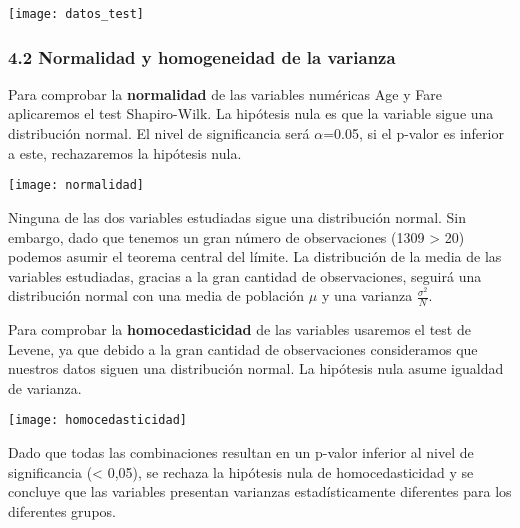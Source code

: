 \documentclass[12pt]{article}
\begin{document}
\label{imagen}
  	\begin{center}
  	\texttt{[image: datos\_test]}
\end{center}

\hypertarget{normalidad}{%
\subsubsection{4.2  Normalidad y homogeneidad de la varianza}\label{normalidad}}
Para comprobar la \textbf{normalidad} de las variables numéricas Age y Fare aplicaremos el test Shapiro-Wilk. La hipótesis nula es que la variable sigue una distribución normal. El nivel de significancia será 
$\alpha$=0.05, si el p-valor es inferior a este, rechazaremos la hipótesis nula. 

\label{imagen}
  	\begin{center}
  	\texttt{[image: normalidad]}
\end{center}

Ninguna de las dos variables estudiadas sigue una distribución normal. Sin embargo, dado que tenemos un gran número de observaciones (1309 > 20) podemos asumir el teorema central del límite. La distribución de la media de las variables estudiadas, gracias a la gran cantidad de observaciones, seguirá una distribución normal con una media de población $\mu$ y una varianza $\frac{\sigma^2}{N}$.

Para comprobar la \textbf{homocedasticidad} de las variables usaremos el test de Levene, ya que debido a la gran cantidad de observaciones consideramos que nuestros datos siguen una distribución normal. La hipótesis nula asume igualdad de varianza.

\label{imagen}
  	\begin{center}
  	\texttt{[image: homocedasticidad]}
\end{center}


Dado que todas las combinaciones resultan en un p-valor inferior al nivel de significancia (< 0,05), se rechaza la hipótesis nula de homocedasticidad y se concluye que las variables presentan varianzas estadísticamente diferentes para los diferentes grupos.
\end{document}
